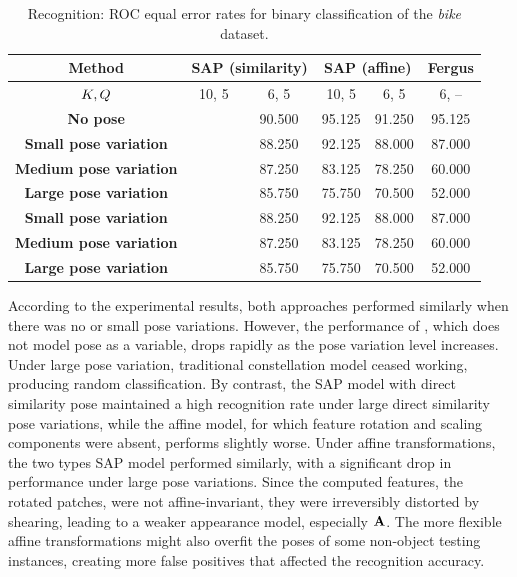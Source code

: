 \begin{table}
	\centering
	\begin{tabular}{|c|cc|cc|c|}
		\hline 
		\textbf{Method} & \multicolumn{2}{|c|}{SAP (similarity)} & \multicolumn{2}{|c|}{SAP (affine)} & Fergus \etal \cite{Fergus2007} \\  
		\hline 
		\hline 
		$K, Q$ & 10, 5 & 6, 5 & 10, 5 & 6, 5 & 6, -- \\		
		\hline 
		\textbf{No pose} 		& \color{blue}{95.500} & 90.500 & 95.125 & 91.250 & 95.125 \\ 
		\hline 
		\textbf{Small pose variation} 	& \color{blue}{94.625} & 88.250 & 92.125 & 88.000 & 87.000 \\ 
		\textbf{Medium pose variation} 	& \color{blue}{93.250} & 87.250 & 83.125 & 78.250 & 60.000 \\ 
		\textbf{Large pose variation} 	& \color{blue}{92.250} & 85.750 & 75.750 & 70.500 & 52.000 \\ 
		\hline
		\textbf{Small pose variation} 	& \color{blue}{94.625} & 88.250 & 92.125 & 88.000 & 87.000 \\ 
		\textbf{Medium pose variation} 	& \color{blue}{93.250} & 87.250 & 83.125 & 78.250 & 60.000 \\ 
		\textbf{Large pose variation} 	& \color{blue}{92.250} & 85.750 & 75.750 & 70.500 & 52.000 \\ 
		\hline 
	\end{tabular}
	\caption{Recognition: ROC equal error rates for binary classification of the \emph{bike} dataset.}
	\label{tab/reg/regresult2d}
\end{table}

According to the experimental results, both approaches performed similarly when there was no or small pose variations. However, the performance of \cite{Fergus2007}, which does not model pose as a variable, drops rapidly as the pose variation level increases. Under large pose variation, traditional constellation model \cite{Fergus2007} ceased working, producing random classification. 
By contrast, the SAP model with direct similarity pose maintained a high recognition rate under large direct similarity pose variations, while the affine model, for which feature rotation and scaling components were absent, performs slightly worse. 
Under affine transformations, the two types SAP model performed similarly, with a significant drop in performance under large pose variations. Since the computed features, \ie the rotated patches, were not affine-invariant, they were irreversibly distorted by shearing, leading to a weaker appearance model, especially $\mathbf{A}$.
The more flexible affine transformations might also overfit the poses of some non-object testing instances, creating more false positives that affected the recognition accuracy. 

